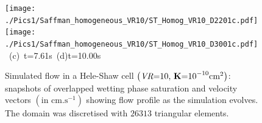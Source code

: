 \begin{landscape}
\begin{figure}[ht]
{{      %
      \texttt{[image: ./Pics1/Saffman\_homogeneous\_VR10/ST\_Homog\_VR10\_D2201c.pdf]}
      \hspace{4cm}\texttt{[image: ./Pics1/Saffman\_homogeneous\_VR10/ST\_Homog\_VR10\_D3001c.pdf]}}
\vspace{0.cm}
\hbox{ \hspace{5.cm} (c) t=7.61s \hspace{8.cm} (d)t=10.00s}
\vspace{0.cm}
}   
\caption{Simulated flow in a Hele-Shaw cell $\left(\text{{\it VR}=10, {\bf K}=10}^{-10}\text{cm}^{2}\right)$: snapshots of overlapped wetting phase saturation and velocity vectors $\left(\text{in cm.s}^{-1}\right)$ showing flow profile as the simulation evolves. The domain was discretised with $26313$  triangular elements.}
\label{fig:homoheleshaw_VN10}
\end{figure}
\end{landscape}
\clearpage

